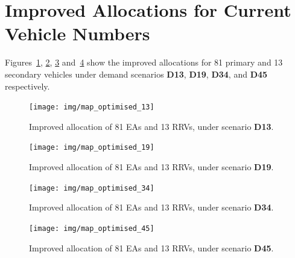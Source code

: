 \documentclass[numbers,webpdf,imaman]{ima-authoring-template}%
\begin{document}
\section{Improved Allocations for Current Vehicle Numbers}
Figures~\ref{fig:optimal_current_allocation_13},
\ref{fig:optimal_current_allocation_19}, \ref{fig:optimal_current_allocation_34}
and~\ref{fig:optimal_current_allocation_45} show the improved allocations for
81 primary and 13 secondary vehicles under demand scenarios \textbf{D13},
\textbf{D19}, \textbf{D34}, and \textbf{D45} respectively.

\begin{figure}
\begin{center}
\texttt{[image: img/map\_optimised\_13]}
\caption{Improved allocation of 81 EAs and 13 RRVs, under scenario \textbf{D13}.}
\label{fig:optimal_current_allocation_13}
\end{center}
\end{figure}

\begin{figure}
\begin{center}
\texttt{[image: img/map\_optimised\_19]}
\caption{Improved allocation of 81 EAs and 13 RRVs, under scenario \textbf{D19}.}
\label{fig:optimal_current_allocation_19}
\end{center}
\end{figure}

\begin{figure}
\begin{center}
\texttt{[image: img/map\_optimised\_34]}
\caption{Improved allocation of 81 EAs and 13 RRVs, under scenario \textbf{D34}.}
\label{fig:optimal_current_allocation_34}
\end{center}
\end{figure}

\begin{figure}
\begin{center}
\texttt{[image: img/map\_optimised\_45]}
\caption{Improved allocation of 81 EAs and 13 RRVs, under scenario \textbf{D45}.}
\label{fig:optimal_current_allocation_45}
\end{center}
\end{figure}

\newpage

% 
% 


\end{document}
